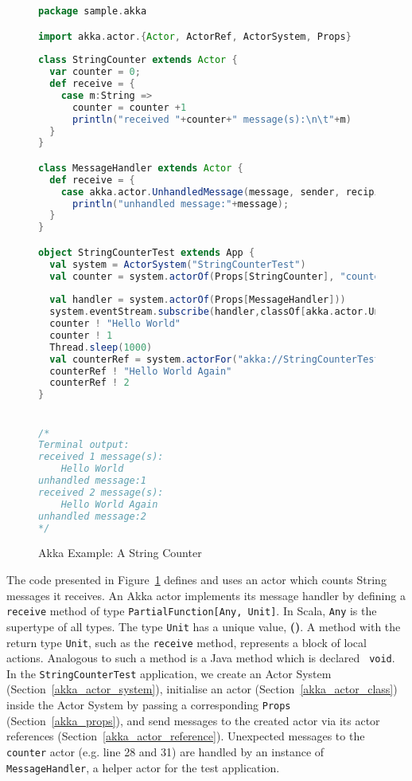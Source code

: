 \begin{figure}[p]
      \begin{lstlisting}[language=scala]
package sample.akka

import akka.actor.{Actor, ActorRef, ActorSystem, Props}
      
class StringCounter extends Actor {
  var counter = 0;
  def receive = {
    case m:String => 
      counter = counter +1
      println("received "+counter+" message(s):\n\t"+m)
  }
}

class MessageHandler extends Actor {
  def receive = {
    case akka.actor.UnhandledMessage(message, sender, recipient) =>
      println("unhandled message:"+message);
  }
}

object StringCounterTest extends App {
  val system = ActorSystem("StringCounterTest")
  val counter = system.actorOf(Props[StringCounter], "counter")
  
  val handler = system.actorOf(Props[MessageHandler]))
  system.eventStream.subscribe(handler,classOf[akka.actor.UnhandledMessage]);
  counter ! "Hello World"
  counter ! 1
  Thread.sleep(1000)
  val counterRef = system.actorFor("akka://StringCounterTest/user/counter")
  counterRef ! "Hello World Again"
  counterRef ! 2
}


/*
Terminal output:
received 1 message(s):
	Hello World
unhandled message:1	
received 2 message(s):
	Hello World Again
unhandled message:2
*/
    \end{lstlisting}
    \caption{Akka Example: A String Counter}
 \label{fig:akka_string_counter}    
\end{figure}

The code presented in Figure~\ref{fig:akka_string_counter} defines and uses an
actor which counts String messages it receives.  An Akka actor implements its 
message handler by defining a {\tt receive} method of type 
{\tt PartialFunction[Any, Unit]}.  In Scala, {\tt Any} is the supertype of all types.  
The type {\tt Unit} has a unique value, {\bf ()}.  A method with the return 
type {\tt Unit}, such as the  {\tt receive} method, represents a block of local 
actions.  Analogous to such a method is a Java method which is declared {\tt 
void}. In the {\tt StringCounterTest} application, we create an Actor System 
(Section~\ref{akka_actor_system}), initialise an actor (Section~\ref{akka_actor_class}) 
inside the Actor System by passing a corresponding {\tt Props} (Section~\ref{akka_props}),
and send messages to the created actor via its actor references (Section~\ref{akka_actor_reference}).
Unexpected messages to the {\tt counter} actor (e.g. line 28 and 31) are handled
by an instance of {\tt  MessageHandler}, a helper actor for the test 
application. 



